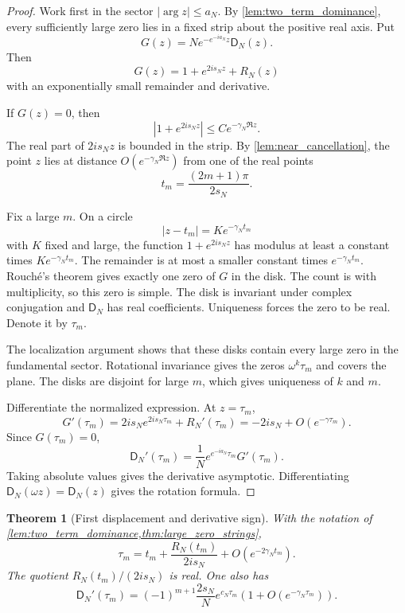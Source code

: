 \documentclass{aomart}
\newtheorem{theorem}{Theorem}[section]
\theoremstyle{definition}
\theoremstyle{remark}
\newcommand{\Dfun}{\mathsf D}
\begin{document}
\begin{proof}
Work first in the sector $|\arg z|\leq a_N$.  By \cref{lem:two_term_dominance}, every sufficiently large zero lies in a fixed strip about the positive real axis.  Put
\[
G(z)=N e^{-e^{-ia_N}z}\Dfun_N(z).
\]
Then
\[
G(z)=1+e^{2is_Nz}+R_N(z)
\]
with an exponentially small remainder and derivative.

If $G(z)=0$, then
\[
|1+e^{2is_Nz}|
\leq
C e^{-\gamma_N\Re z}.
\]
The real part of $2is_Nz$ is bounded in the strip.  By \cref{lem:near_cancellation}, the point $z$ lies at distance $O(e^{-\gamma_N\Re z})$ from one of the real points
\[
 t_m=\frac{(2m+1)\pi}{2s_N}.
\]

Fix a large $m$.  On a circle
\[
|z-t_m|=K e^{-\gamma_Nt_m}
\]
with $K$ fixed and large, the function $1+e^{2is_Nz}$ has modulus at least a constant times $K e^{-\gamma_Nt_m}$.  The remainder is at most a smaller constant times $e^{-\gamma_Nt_m}$.  Rouch\'e's theorem gives exactly one zero of $G$ in the disk.  The count is with multiplicity, so this zero is simple.  The disk is invariant under complex conjugation and $\Dfun_N$ has real coefficients.  Uniqueness forces the zero to be real.  Denote it by $\tau_m$.

The localization argument shows that these disks contain every large zero in the fundamental sector.  Rotational invariance gives the zeros $\omega^k\tau_m$ and covers the plane.  The disks are disjoint for large $m$, which gives uniqueness of $k$ and $m$.

Differentiate the normalized expression.  At $z=\tau_m$,
\[
G'(\tau_m)
=
2is_Ne^{2is_N\tau_m}+R_N'(\tau_m)
=
-2is_N+O(e^{-\gamma\tau_m}).
\]
Since $G(\tau_m)=0$,
\[
\Dfun_N'(\tau_m)
=
\frac1N e^{e^{-ia_N}\tau_m}G'(\tau_m).
\]
Taking absolute values gives the derivative asymptotic.  Differentiating $\Dfun_N(\omega z)=\Dfun_N(z)$ gives the rotation formula.
\end{proof}

\begin{theorem}[First displacement and derivative sign]\label{thm:first_zero_correction}
With the notation of \cref{lem:two_term_dominance,thm:large_zero_strings},
\[
\tau_m
=
t_m+
\frac{R_N(t_m)}{2is_N}
+
O(e^{-2\gamma_Nt_m}).
\]
The quotient $R_N(t_m)/(2is_N)$ is real.  One also has
\[
\Dfun_N'(\tau_m)
=
(-1)^{m+1}
\frac{2s_N}{N}
e^{c_N\tau_m}
\left(1+O(e^{-\gamma_N\tau_m})\right).
\]
\end{theorem}
\end{document}
